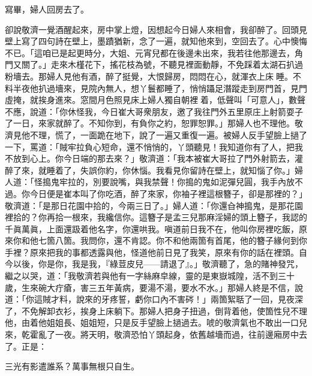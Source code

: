 寫畢，婦人回房去了。

卻說敬濟一覺酒醒起來，房中掌上燈，因想起今日婦人來相會，我卻醉了。回頭見壁上寫了四句詩在壁上，墨蹟猶新，念了一遍，就知他來到，空回去了。心中懊悔不已。「這咱已是起更時分，大姐、元宵兒都在後邊未出來，我若往他那邊去，角門又關了。」走來木槿花下，搖花枝為號，不聽見裡面動靜，不免踩着太湖石扒過粉墻去。那婦人見他有酒，醉了挺覺，大恨歸房，悶悶在心，就渾衣上床𢱉睡。不料半夜他扒過墻來，見院內無人，想丫鬟都睡了，悄悄躡足潛蹤走到房門首，見門虛掩，就挨身進來。窓間月色照見床上婦人獨自朝裡𢱉着，低聲叫「可意人」，數聲不應，說道：「你休怪我，今日崔大哥衆朋友，邀了我往門外五里原庄上射箭耍子了一日，來家就醉了。不知你到，有負你之約，恕罪恕罪。」那婦人也不理他。敬濟見他不理，慌了，一面跪在地下，說了一遍又重復一遍。{}被婦人反手望臉上撾了一下，罵道：「賊牢拉負心短命，還不悄悄的，丫頭聽見！我知道你有了人，把我不放到心上。你今日端的那去來？」敬濟道：「我本被崔大哥拉了門外射箭去，灌醉了來，就睡着了，失誤你約，你休惱。我看見你留詩在壁上，就知惱了你。」婦人道：「怪搗鬼牢拉的，別要說嘴，與我禁聲！你搗的鬼如泥彈兒圓，我手內放不過。你今日便是崔本叫了你吃酒，醉了來家，你袖子裡這根簪子，卻是那裡的？」敬濟道：「是那日花園中拾的，今兩三日了。」婦人道：「你還㒲神搗鬼，是那花園裡拾的？你再拾一根來，我纔信你。{}這簪子是孟三兒那麻淫婦的頭上簪子，{}我認的千眞萬眞，上面還趿着他名字，你還哄我。嗔道前日我不在，他叫你房裡吃飯，原來你和他七箇八箇。我問你，還不肯認。你不和他兩箇有首尾，他的簪子緣何到你手裡？原來把我的事都透露與他，怪道他前日見了我笑，{}原來有你的話在裡頭。自今以後，你是你，我是我，『綠荳皮兒——請退了』。」敬濟聽了，急的賭神發咒，繼之以哭，{}道：「我敬濟若與他有一字絲麻皁線，靈的是東嶽城隍，活不到三十歲，生來碗大疔瘡，害三五年黃病，要湯不湯，要水不水。」{}那婦人終是不信，說道：「你這賊才料，說來的牙疼誓，虧你口內不害硶！」兩箇絮聒了一回，見夜深了，不免解卸衣衫，挨身上床躺下。那婦人把身子扭過，倒背着他，使箇性兒不理他，由着他姐姐長、姐姐短，只是反手望臉上撾過去。{}唬的敬濟氣也不敢出一口兒來，乾霍亂了一夜。將天明，敬濟恐怕丫頭起身，依舊越墻而過，往前邊廂房中去了。正是：

\begin{myquote}
三光有影遣誰系？萬事無根只自生。
\end{myquote}

